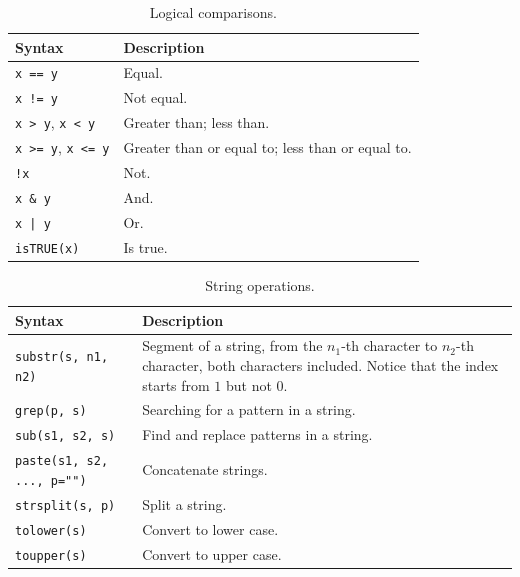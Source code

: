 \begin{table}[!htb]
  \centering \caption{Logical comparisons.}\label{ch:r1:tab:logicalcomparison}
  \begin{tabularx}{\textwidth}{lX}
    \hline
    Syntax & Description \\ \hline
    \verb|x == y| & Equal. \\
    \verb|x != y| & Not equal. \\
    \verb|x > y|, \verb|x < y| & Greater than; less than. \\
    \verb|x >= y|, \verb|x <= y| & Greater than or equal to; less than or equal to. \\
    \verb|!x| & Not. \\
    \verb|x & y| & And. \\
    \verb$x | y$ & Or. \\
    \verb|isTRUE(x)| & Is true. \\
    \hline
  \end{tabularx}
\end{table}

\begin{table}[!htb]
  \centering \caption{String operations.}\label{ch:r1:tab:stringoperation}
  \begin{tabularx}{\textwidth}{lX}
    \hline
    Syntax & Description \\ \hline
    \verb|substr(s, n1, n2)| & Segment of a string, from the $n_1$-th character to $n_2$-th character, both characters included. Notice that the index starts from $1$ but not $0$. \\
    \verb|grep(p, s)| & Searching for a pattern in a string. \\
    \verb|sub(s1, s2, s)| & Find and replace patterns in a string. \\
    \verb|paste(s1, s2, ..., p="")| & Concatenate strings. \\
    \verb|strsplit(s, p)| & Split a string. \\
    \verb|tolower(s)| & Convert to lower case. \\
    \verb|toupper(s)| & Convert to upper case. \\
    \hline
  \end{tabularx}
\end{table}

